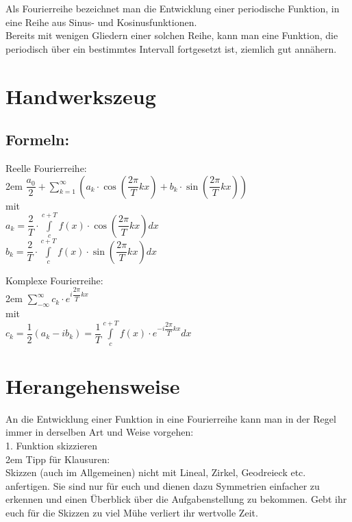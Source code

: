 \documentclass[11pt,final]{scrreprt}
\newcommand{\br} {\medskip\\}
\newcommand{\gbr} {\bigskip\\}
\begin{document}
Als Fourierreihe bezeichnet man die Entwicklung einer periodische Funktion, in eine Reihe aus Sinus- und Kosinusfunktionen.\\
Bereits mit wenigen Gliedern einer solchen Reihe, kann man eine Funktion, die periodisch über ein bestimmtes Intervall fortgesetzt ist, ziemlich gut annähern.\\

\section{Handwerkszeug}

\subsection*{Formeln:}\bigskip

Reelle Fourierreihe: \\

\begingroup
\leftskip2em 
$ \dfrac{a_0}{2} + \sum\limits_{k=1}^{\infty} (a_k \cdot \cos(\dfrac{2\pi}{T} kx) + b_k \cdot \sin(\dfrac{2\pi}{T} kx)) $\br
mit\\
$ a_k = \dfrac{2}{T} \cdot \int\limits_{c}^{c+T} f(x) \cdot \cos(\dfrac{2\pi}{T} kx) dx $\\
$ b_k = \dfrac{2}{T} \cdot \int\limits_{c}^{c+T} f(x) \cdot \sin(\dfrac{2\pi}{T} kx) dx $\gbr
\par	
\endgroup 

Komplexe Fourierreihe:\\

\begingroup
\leftskip2em 
$ \sum\limits_{-\infty}^{\infty} c_k \cdot e^{i\dfrac{2\pi}{T} kx} $\br
mit\\
$ c_k = \dfrac{1}{2} (a_k - ib_k) = \dfrac{1}{T} \int\limits_{c}^{c+T} f(x) \cdot e^{-i\dfrac{2\pi}{T}kx} dx $\\
\par	
\endgroup 

\section{Herangehensweise}

An die Entwicklung einer Funktion in eine Fourierreihe kann man in der Regel immer in derselben Art und Weise vorgehen:\\

1. Funktion skizzieren\br

\begingroup
\leftskip2em 
Tipp für Klausuren:\\
Skizzen (auch im Allgemeinen) nicht mit Lineal, Zirkel, Geodreieck etc. anfertigen. Sie sind nur für euch und dienen dazu Symmetrien einfacher zu erkennen und einen Überblick über die Aufgabenstellung zu bekommen. Gebt ihr euch für die Skizzen zu viel Mühe verliert ihr wertvolle Zeit.\\
\par	
\endgroup 
\end{document}
